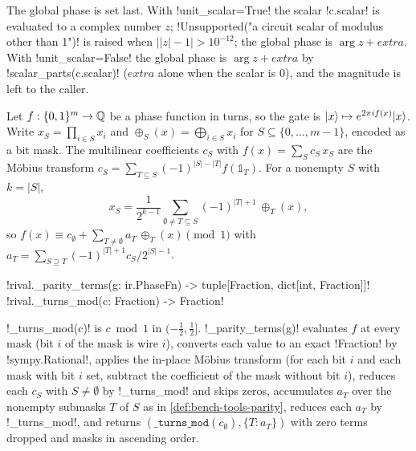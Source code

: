 The global phase is set last. With \py!unit_scalar=True! the scalar \py!c.scalar! is evaluated to a complex number $z$; \py!Unsupported("a circuit scalar of modulus other than 1")! is raised when $\bigl||z|-1\bigr|>10^{-12}$; the global phase is $\arg z+\mathit{extra}$. With \py!unit_scalar=False! the global phase is $\arg z+\mathit{extra}$ by \py!scalar_parts(c.scalar)! ($\mathit{extra}$ alone when the scalar is $0$), and the magnitude is left to the caller.

\begin{definition}\label{def:bench-tools-parity}
Let $f:\{0,1\}^m\to\mathbb{Q}$ be a phase function in turns, so the gate is $\lvert x \rangle\mapsto e^{2\pi i f(x)}\lvert x \rangle$. Write $x_S=\prod_{i\in S}x_i$ and $\oplus_S(x)=\bigoplus_{i\in S}x_i$ for $S\subseteq\{0,\ldots,m-1\}$, encoded as a bit mask. The multilinear coefficients $c_S$ with $f(x)=\sum_S c_S\,x_S$ are the Möbius transform $c_S=\sum_{T\subseteq S}(-1)^{|S|-|T|}f(\mathbb 1_T)$. For a nonempty $S$ with $k=|S|$,
\[
  x_S=\frac{1}{2^{k-1}}\sum_{\emptyset\neq T\subseteq S}(-1)^{|T|+1}\,\oplus_T(x),
\]
so $f(x)\equiv c_\emptyset+\sum_{T\neq\emptyset}a_T\,\oplus_T(x)\pmod 1$ with $a_T=\sum_{S\supseteq T}(-1)^{|T|+1}c_S/2^{|S|-1}$.
\end{definition}

\begin{signature}
\py!rival._parity_terms(g: ir.PhaseFn) -> tuple[Fraction, dict[int, Fraction]]!\\
\py!rival._turns_mod(c: Fraction) -> Fraction!
\end{signature}

\py!_turns_mod(c)! is $c\bmod1$ in $(-\tfrac12,\tfrac12]$. \py!_parity_terms(g)! evaluates $f$ at every mask (bit $i$ of the mask is wire $i$), converts each value to an exact \py!Fraction! by \py!sympy.Rational!, applies the in-place Möbius transform (for each bit $i$ and each mask with bit $i$ set, subtract the coefficient of the mask without bit $i$), reduces each $c_S$ with $S\neq\emptyset$ by \py!_turns_mod! and skips zeros, accumulates $a_T$ over the nonempty submasks $T$ of $S$ as in \cref{def:bench-tools-parity}, reduces each $a_T$ by \py!_turns_mod!, and returns $(\texttt{\_turns\_mod}(c_\emptyset), \{T: a_T\})$ with zero terms dropped and masks in ascending order.

